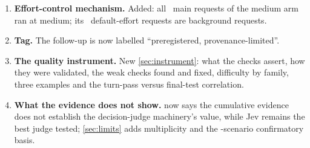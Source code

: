 \begin{enumerate}[leftmargin=1.6em]
    Fable anchor session (the reviewer's figure was close) and \$\RgResidFableSticky\ per Fable sticky session (lower
    than the reviewer's, which priced sticky at the host rate). Removing it moves no confirmatory cell by more than
    \RgResidShiftMax, somewhat more than the reviewer's estimate; no verdict changes. The \RgBigN\ very large first
    writes are the sessions that found the shared tool prefix cold.
  \item \textbf{Effort-control mechanism.} Added: all \RgEcMainMedium\ main requests of the medium arm ran at medium;
    its \RgEcNonMainDefault\ default-effort requests are background requests.
  \item \textbf{Tag.} The follow-up is now labelled ``preregistered, provenance-limited''.
  \item \textbf{The quality instrument.} New \cref{sec:instrument}: what the checks assert, how they were validated,
    the weak checks found and fixed, difficulty by family, three examples and the turn-pass versus final-test
    correlation.
  \item \textbf{What the evidence does not show.}  now says the cumulative evidence does not establish
    the decision-judge machinery's value, while Jev remains the best judge tested; \cref{sec:limits} adds
    multiplicity and the \NTest-scenario confirmatory basis.
\end{enumerate}
